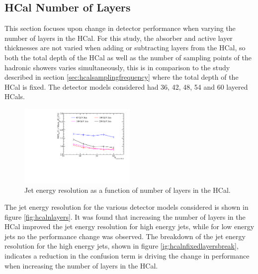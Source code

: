 
\subsection{HCal Number of Layers}
\label{sec:hcalnlayers}

This section focuses upon change in detector performance when varying the number of layers in the HCal.  For this study, the absorber and active layer thicknesses are not varied when adding or subtracting layers from the HCal, so both the total depth of the HCal as well as the number of sampling points of the hadronic showers varies simultaneously, this is in comparison to the study described in section \ref{sec:hcalsamplingfrequency} where the total depth of the HCal is fixed.  The detector models considered had 36, 42, 48, 54 and 60 layered HCals.  

\begin{figure}
\centering
\includegraphics[width=0.5\textwidth]{OptimisationStudies/Plots/JetEnergyResolutions/JER_vs_NumberOfHCalLayersOfFixedDepth.pdf}
\caption[Jet energy resolution as a function of number of layers in the HCal.]{Jet energy resolution as a function of number of layers in the HCal.}
\label{fig:hcalnfixedlayers}
\end{figure}

The jet energy resolution for the various detector models considered is shown in figure \ref{fig:hcalnlayers}.  It was found that increasing the number of layers in the HCal improved the jet energy resolution for high energy jets, while for low energy jets no the performance change was observed.  The breakdown of the jet energy resolution for the high energy jets, shown in figure \ref{ig:hcalnfixedlayersbreak}, indicates a reduction in the confusion term is driving the change in performance when increasing the number of layers in the HCal.  

